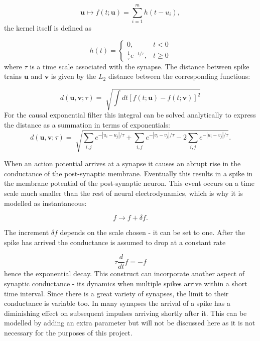 \documentclass[12pt]{extarticle}
\begin{document}
\begin{equation}
\mathbf{u} \mapsto f(t; \mathbf{u}) = \sum_{i=1}^{m} h(t - u_i),
\end{equation}
the kernel itself is defined as 

\begin{equation}
h(t) = \begin{cases}
    0, & t<0\\
    \frac{1}{\tau} e^{-t/\tau}, & t \geq 0
  \end{cases}
\end{equation}
where $\tau$ is a time scale associated with the synapse. The distance
between spike trains $\mathbf{u}$ and $\mathbf{v}$ is given by the
$L_2$ distance between the corresponding functions:

\begin{equation}
d(\mathbf{u}, \mathbf{v}; \tau) = \sqrt[]{\int dt[f(t;\mathbf{u}) - f(t;\mathbf{v})]^2}
\end{equation}
For the causal exponential filter this integral can be solved analytically \cite{Houghton-Kreuz.12} to express the distance as a summation in terms of exponentials:
\begin{equation}
d(\mathbf{u}, \mathbf{v}; \tau) = \sqrt[]{\sum_{i,j} e^{-|u_i-u_j|/\tau} + \sum_{i,j} e^{-|v_i-v_j|/\tau} -2\sum_{i,j} e^{-|u_i-v_j|/\tau} }. 
\end{equation}


\noindent
When an action potential arrives at a synapse it causes an abrupt
rise in the conductance of the post-synaptic membrane. Eventually this 
results in a spike in the membrane potential of the post-synaptic
neuron. This event occurs on a time scale much smaller than the rest
of neural electrodynamics, which is why it is modelled as
instantaneous:

\begin{equation}
f \rightarrow f + \delta f.
\end{equation}

\noindent
The increment $\delta f$ depends on the scale chosen - it can be set to one. 
After the spike has arrived the conductance is assumed to drop at a constant rate

\begin{equation}
\tau \frac{d}{dt}f = - f
\end{equation}
hence the exponential decay. This construct can incorporate another
aspect of synaptic conductance - its dynamics when multiple spikes
arrive within a short time interval. Since there is a great variety of
synapses, the limit to their conductance is variable too. In many
synapses the arrival of a spike has a diminishing effect on subsequent
impulses arriving shortly after it. This can be modelled by adding an
extra parameter but will not be discussed here as it is not necessary
for the purposes of this project.\\
\end{document}
